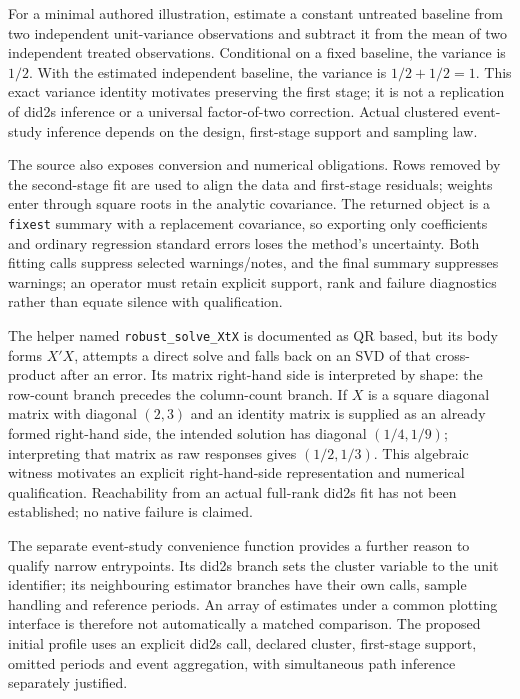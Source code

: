 For a minimal authored illustration, estimate a constant untreated baseline
from two independent unit-variance observations and subtract it from the mean
of two independent treated observations. Conditional on a fixed baseline,
the variance is $1/2$. With the estimated independent baseline, the variance
is $1/2+1/2=1$. This exact variance identity motivates preserving the first
stage; it is not a replication of did2s inference or a universal factor-of-two
correction. Actual clustered event-study inference depends on the design,
first-stage support and sampling law.\citep{exec24_panel_reuse_reference}

The source also exposes conversion and numerical obligations. Rows removed
by the second-stage fit are used to align the data and first-stage residuals;
weights enter through square roots in the analytic covariance. The returned
object is a \texttt{fixest} summary with a replacement covariance, so exporting
only coefficients and ordinary regression standard errors loses the method's
uncertainty. Both fitting calls suppress selected warnings/notes, and the
final summary suppresses warnings; an operator must retain explicit support,
rank and failure diagnostics rather than equate silence with qualification.
\citep{exec24_did2s_reuse_source}

The helper named \texttt{robust\_solve\_XtX} is documented as QR based, but its
body forms $X'X$, attempts a direct solve and falls back on an SVD of that
cross-product after an error. Its matrix right-hand side is interpreted by
shape: the row-count branch precedes the column-count branch. If $X$ is a
square diagonal matrix with diagonal $(2,3)$ and an identity matrix is supplied
as an already formed right-hand side, the intended solution has diagonal
$(1/4,1/9)$; interpreting that matrix as raw responses gives $(1/2,1/3)$.
This algebraic witness motivates an explicit right-hand-side representation
and numerical qualification. Reachability from an actual full-rank did2s
fit has not been established; no native failure is claimed.
\citep{exec24_did2s_reuse_source,exec24_panel_reuse_reference}

The separate event-study convenience function provides a further reason to
qualify narrow entrypoints. Its did2s branch sets the cluster variable to the
unit identifier; its neighbouring estimator branches have their own calls,
sample handling and reference periods. An array of estimates under a common
plotting interface is therefore not automatically a matched comparison.
The proposed initial profile uses an explicit did2s call, declared cluster,
first-stage support, omitted periods and event aggregation, with simultaneous
path inference separately justified.\citep{exec24_did2s_reuse_source}

